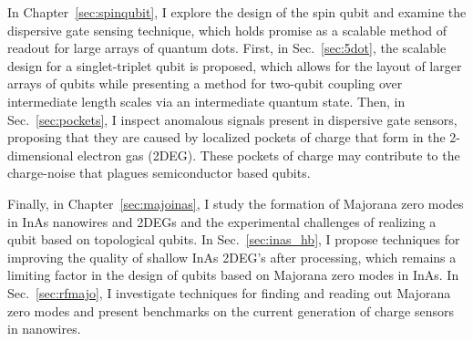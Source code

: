 In Chapter~\ref{sec:spinqubit}, I explore the design of the spin qubit and examine the dispersive gate sensing technique,
which holds promise as a scalable method of readout for large arrays of quantum dots. First, in Sec.~\ref{sec:5dot},
the scalable design for a singlet-triplet qubit is proposed, which allows for the layout of larger arrays of qubits
while presenting a method for two-qubit coupling over intermediate length scales via an intermediate quantum state.
Then, in Sec.~\ref{sec:pockets}, I inspect anomalous signals present in dispersive gate sensors, proposing that they
are caused by localized pockets of charge that form in the 2-dimensional electron gas (2DEG). These pockets of charge may
contribute to the charge-noise that plagues semiconductor based qubits.

Finally, in Chapter~\ref{sec:majoinas}, I study the formation of Majorana zero modes in InAs nanowires and
2DEGs and the experimental challenges of realizing a qubit based on topological qubits. In Sec.~\ref{sec:inas_hb},
I propose techniques for improving the quality of shallow InAs 2DEG's after processing, which remains a limiting
factor in the design of qubits based on Majorana zero modes in InAs. In Sec.~\ref{sec:rfmajo}, I investigate
techniques for finding and reading out Majorana zero modes and present benchmarks on the current generation
of charge sensors in nanowires.